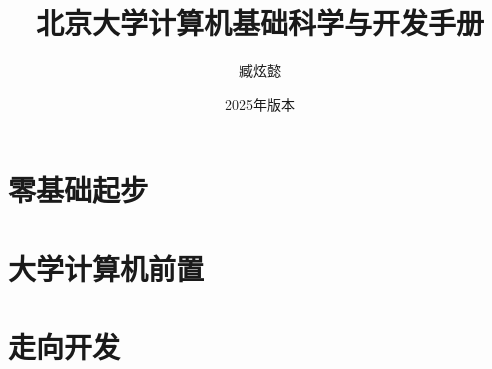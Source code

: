 \documentclass[12pt, openany]{book}
\title{\Huge\textbf{北京大学计算机基础科学与开发手册}}
\author[a]{臧炫懿}
\affil[a]{北京大学信息科学技术学院、北京大学学生Linux俱乐部}
\date{2025年版本}
\begin{document}
\maketitle

\frontmatter



\mainmatter

\tableofcontents


\part{零基础起步}









\part{大学计算机前置}









\part{走向开发}





\appendix





\backmatter


\end{document}

